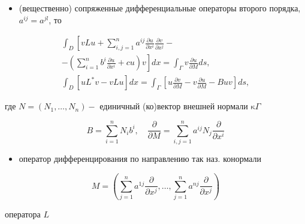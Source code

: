 \documentclass[10pt]{article}
\begin{document}
\begin{itemize}

  \item (вещественно) сопряженные дифференциальные операторы второго порядка, $a^{i j}=a^{j l}$, то

\end{itemize}



\[

\begin{gathered}

\int_{D}\left[v L u+\sum_{i, j=1}^{n} a^{i j} \frac{\partial u}{\partial x^{i}} \frac{\partial v}{\partial x^{j}}-\right. \\

\left.-\left(\sum_{i=1}^{n} b^{i} \frac{\partial u}{\partial x^{i}}+c u\right) v\right] d x=\int_{\Gamma} v \frac{\partial u}{\partial M} d s, \\

\int_{D}\left[u L^{*} v-v L u\right] d x=\int_{\Gamma}\left[u \frac{\partial v}{\partial M}-v \frac{\partial u}{\partial M}-B u v\right] d s,

\end{gathered}

\]



где $N=\left(N_{1}, \ldots, N_{n}\right)-$ единичный (ко)вектор внешней нормали $\mathrm{\kappa} \Gamma$



\[

B=\sum_{i=1}^{n} N_{i} b^{i}, \quad \frac{\partial}{\partial M}=\sum_{i, j=1}^{n} a^{i j} N_{j} \frac{\partial}{\partial x^{i}}

\]



\begin{itemize}

  \item оператор дифференцирования по направлению так наз. конормали

\end{itemize}



\[

M=\left(\sum_{j=1}^{n} a^{1 j} \frac{\partial}{\partial x^{j}}, \ldots, \sum_{j=1}^{n} a^{n j} \frac{\partial}{\partial x^{j}}\right)

\]



оператора $L$
\end{document}
